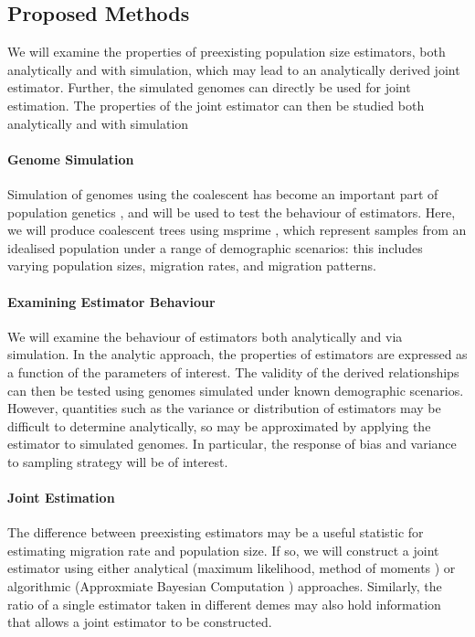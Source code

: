 \documentclass[11pt, a4paper]{article}
\begin{document}
\begin{linenumbers}
\section*{Proposed Methods}	
\noindent We will examine the properties of preexisting population size estimators, both analytically and with simulation, which may lead to an analytically derived joint estimator. Further, the simulated genomes can directly be used for joint estimation. The properties of the joint estimator can then be studied both analytically and with simulation

\paragraph{Genome Simulation}
Simulation of genomes using the coalescent has become an important part of population genetics \cite{msprime}, and will be used to test the behaviour of estimators. Here, we will produce coalescent trees using msprime \cite{msprimearticle}, which represent samples from an idealised population under a range of demographic scenarios: this includes varying population sizes, migration rates, and migration patterns.

\paragraph{Examining Estimator Behaviour}
We will examine the behaviour of estimators both analytically and via simulation. In the analytic approach, the properties of estimators are expressed as a function of the parameters of interest. The validity of the derived relationships can then be tested using genomes simulated under known demographic scenarios. However, quantities such as the variance or distribution of estimators may be difficult to determine analytically, so may be approximated by applying the estimator to simulated genomes. In particular, the response of bias and variance to sampling strategy will be of interest.

\paragraph{Joint Estimation}
The difference between preexisting estimators may be a useful statistic for estimating migration rate and population size. If so, we will construct a joint estimator using either analytical (maximum likelihood, method of moments \cite{wang}) or algorithmic (Approxmiate Bayesian Computation \cite{abc}) approaches. Similarly, the ratio of a single estimator taken in different demes may also hold information that allows a joint estimator to be constructed.


\end{linenumbers}
\end{document}
